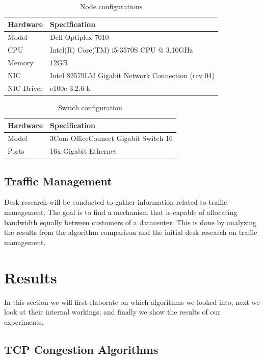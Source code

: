 \documentclass{article}
\begin{document}
\begin{table}[H]
	\centering
	\caption{Node configurations}
	\begin{tabular}[H]{ | l | l | }
	\hline
	\textbf{Hardware} & \textbf{Specification} \\
	\hline  Model & Dell Optiplex 7010\\
	\hline  CPU & Intel(R) Core(TM) i5-3570S CPU @ 3.10GHz\\
	\hline  Memory & 12GB\\
	\hline  NIC & Intel 82579LM Gigabit Network Connection (rev 04)\\
	\hline	NIC Driver & e100e 3.2.6-k\\
	\hline
	\end{tabular}
	\label{table:spec1}
\end{table}

\begin{table}[H]
	\centering
	\caption{Switch configuration}
	\begin{tabular}[H]{ | l | l | }
	\hline
	\textbf{Hardware} & \textbf{Specification} \\
	\hline  Model & 3Com OfficeConnect Gigabit Switch 16\\
	\hline  Ports & 16x Gigabit Ethernet\\
	\hline
	\end{tabular}
	\label{table:spec2}
\end{table}

\subsection{Traffic Management}

Desk research will be conducted to gather information related to traffic management. The goal is to find a mechanism that is capable of allocating bandwidth equally between customers of a datacenter. This is done by analyzing the results from the algorithm comparison and the initial desk research on traffic management.


\section{Results}\label{sec:results}

In this section we will first elaborate on which algorithms we looked into, next we look at their internal workings, and finally we show the results of our experiments.


\subsection{TCP Congestion Algorithms}\label{sub:chosen-algos}
\end{document}

